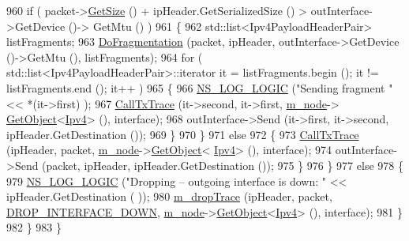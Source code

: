 \begin{DoxyCode}
960           \textcolor{keywordflow}{if} ( packet->\hyperlink{classns3_1_1Packet_a462855c9929954d4301a4edfe55f4f1c}{GetSize} () + ipHeader.GetSerializedSize () > outInterface->GetDevice ()->
      GetMtu () )
961             \{
962               std::list<Ipv4PayloadHeaderPair> listFragments;
963               \hyperlink{classns3_1_1Ipv4L3Protocol_a5ea602dc1447746c0c3bd90e36ec3888}{DoFragmentation} (packet, ipHeader, outInterface->GetDevice ()->GetMtu (), 
      listFragments);
964               \textcolor{keywordflow}{for} ( std::list<Ipv4PayloadHeaderPair>::iterator it = listFragments.begin (); it != 
      listFragments.end (); it++ )
965                 \{
966                   \hyperlink{group__logging_ga88acd260151caf2db9c0fc84997f45ce}{NS\_LOG\_LOGIC} (\textcolor{stringliteral}{"Sending fragment "} << *(it->first) );
967                   \hyperlink{classns3_1_1Ipv4L3Protocol_a04cbb7540c6f22a2870f118715b6a703}{CallTxTrace} (it->second, it->first, \hyperlink{classns3_1_1Ipv4L3Protocol_ad2cc5076c247724f1e99b398edc1965a}{m\_node}->
      \hyperlink{classns3_1_1Object_a13e18c00017096c8381eb651d5bd0783}{GetObject}<\hyperlink{classns3_1_1Ipv4_a1c15284fe630c76e0c9c75a97f1ff234}{Ipv4}> (), interface);
968                   outInterface->Send (it->first, it->second, ipHeader.GetDestination ());
969                 \}
970             \}
971           \textcolor{keywordflow}{else}
972             \{
973               \hyperlink{classns3_1_1Ipv4L3Protocol_a04cbb7540c6f22a2870f118715b6a703}{CallTxTrace} (ipHeader, packet, \hyperlink{classns3_1_1Ipv4L3Protocol_ad2cc5076c247724f1e99b398edc1965a}{m\_node}->\hyperlink{classns3_1_1Object_a13e18c00017096c8381eb651d5bd0783}{GetObject}<
      \hyperlink{classns3_1_1Ipv4_a1c15284fe630c76e0c9c75a97f1ff234}{Ipv4}> (), interface);
974               outInterface->Send (packet, ipHeader, ipHeader.GetDestination ());
975             \}
976         \}
977       \textcolor{keywordflow}{else}
978         \{
979           \hyperlink{group__logging_ga88acd260151caf2db9c0fc84997f45ce}{NS\_LOG\_LOGIC} (\textcolor{stringliteral}{"Dropping -- outgoing interface is down: "} << ipHeader.GetDestination (
      ));
980           \hyperlink{classns3_1_1Ipv4L3Protocol_a80984e2de6a2562b04195b975014cb1b}{m\_dropTrace} (ipHeader, packet, \hyperlink{classns3_1_1Ipv4L3Protocol_a05e7403d60c79529257c4cffdd994da1a8f40f145dce3e9f21e1218ce125a048d}{DROP\_INTERFACE\_DOWN}, 
      \hyperlink{classns3_1_1Ipv4L3Protocol_ad2cc5076c247724f1e99b398edc1965a}{m\_node}->\hyperlink{classns3_1_1Object_a13e18c00017096c8381eb651d5bd0783}{GetObject}<\hyperlink{classns3_1_1Ipv4_a1c15284fe630c76e0c9c75a97f1ff234}{Ipv4}> (), interface);
981         \}
982     \}
983 \}
\end{DoxyCode}


